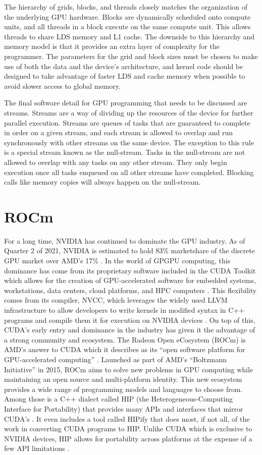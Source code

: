 \quad The hierarchy of grids, blocks, and threads closely matches the organization of the underlying GPU hardware. Blocks are dynamically scheduled onto compute units, and all threads in a block execute on the same compute unit. This allows threads to share LDS memory and L1 cache. The downside to this hierarchy and memory model is that it provides an extra layer of complexity for the programmer. The parameters for the grid and block sizes must be chosen to make use of both the data and the device’s architecture, and kernel code should be designed to take advantage of faster LDS and cache memory when possible to avoid slower access to global memory. 

\quad The final software detail for GPU programming that needs to be discussed are streams. Streams are a way of dividing up the resources of the device for further parallel execution. Streams are queues of tasks that are guaranteed to complete in order on a given stream, and each stream is allowed to overlap and run synchronously with other streams on the same device. The exception to this rule is a special stream known as the null-stream. Tasks in the null-stream are not allowed to overlap with any tasks on any other stream. They only begin execution once all tasks enqueued on all other streams have completed. Blocking calls like memory copies will always happen on the null-stream.


\section{ROCm}

For a long time, NVIDIA has continued to dominate the GPU industry. As of Quarter 2 of 2021, NVIDIA is estimated to hold 83\% marketshare of the discrete GPU market over AMD's 17\% \cite{marketshare}. In the world of GPGPU computing, this dominance has come from its proprietary software included in the CUDA Toolkit which allows for the creation of GPU-accelerated software for embedded systems, workstations, data centers, cloud platforms, and HPC computers \cite{cuda}. This flexibility comes from its compiler, NVCC, which leverages the widely used LLVM infrastructure to allow developers to write kernels in modified syntax in C++ programs and compile them it for execution on NVIDIA devices \cite{nvcc}. On top of this, CUDA's early entry and dominance in the industry has given it the advantage of a strong community and ecosystem. The Radeon Open eCosystem (ROCm) is AMD's answer to CUDA which it describes as its ``open software platform for GPU-accelerated computing'' \cite{rocm}. Launched as part of AMD's ``Boltzmann Initiative'' in 2015, ROCm aims to solve new problems in GPU computing while maintaining an open source and multi-platform identity. This new ecosystem provides a wide range of programming models and languages to choose from. Among those is a C++ dialect called HIP (the Heterogeneous-Computing Interface for Portability) that provides many APIs and interfaces that mirror CUDA's \cite{hip}. It even includes a tool called HIPify that does most, if not all, of the work in converting CUDA programs to HIP. Unlike CUDA which is exclusive to NVIDIA devices, HIP allows for portability across platforms at the expense of a few API limitations \cite{hipfaq}.

